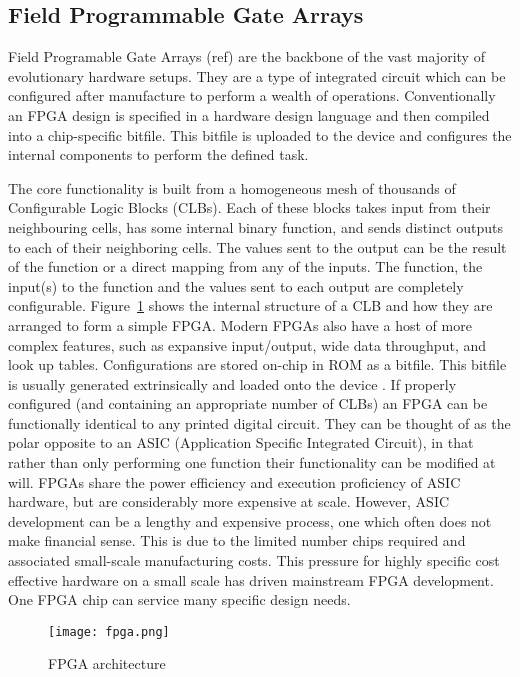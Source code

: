 \subsection{Field Programmable Gate Arrays \label{ss:FPGAs}}
Field Programable Gate Arrays (\todo ref) are the backbone of the vast majority of evolutionary
hardware setups. They are a type of integrated circuit which can be
configured after manufacture to perform a wealth of operations. Conventionally
an FPGA design is specified in a hardware design language and then compiled into a chip-specific bitfile.
This bitfile is uploaded to the device and configures the internal components
to perform the defined task.

The core functionality is built from a homogeneous mesh of
thousands of Configurable Logic Blocks (CLBs).
Each of these blocks takes input from their
neighbouring cells, has some internal binary function, and sends distinct outputs
to each of their neighboring cells. The values sent to the output can be the
result of the function or a direct mapping from any of the inputs. The function, the input(s) to the function
and the values sent to each output are completely configurable. Figure~\ref{fig:fpga}
shows the internal structure of a CLB and how they are arranged to form a simple FPGA.
Modern FPGAs also have a host of more complex features, such as expansive input/output,
wide data throughput, and look up tables.
Configurations are stored on-chip in ROM as a bitfile. This bitfile is usually generated
extrinsically \cite{10.1007/978-3-540-46239-2_5} and loaded onto the device \cite{Kuon:2008:FAS:1454695.1454696}.
If properly configured (and containing an appropriate number of CLBs) an FPGA can
be functionally identical to any printed digital circuit. They can be thought of
as the polar opposite to an ASIC (Application Specific Integrated Circuit), in that
rather than only performing one function their functionality can be modified at will.
FPGAs share the power efficiency and execution proficiency of ASIC hardware, but
are considerably more expensive at scale. However, ASIC development can
be a lengthy and expensive process, one which often does not make financial sense.
This is  due to the limited number chips required and associated small-scale manufacturing
costs. This pressure for highly specific cost effective hardware on a small scale
has driven mainstream FPGA development. One FPGA chip can service many specific
design needs.

\begin{figure}
\centering
\texttt{[image: fpga.png]}
\caption{FPGA architecture}
\label{fig:fpga}
\end{figure}

